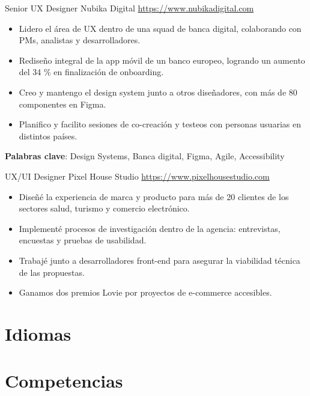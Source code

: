 \documentclass[a4paper, serif, 10pt]{moderncv}
\begin{document}
        {Senior UX Designer}
        {Nubika Digital}
        {\url{https://www.nubikadigital.com}}
        {}
        {\begin{itemize}
\item Lidero el área de UX dentro de una squad de banca digital, colaborando con PMs, analistas y desarrolladores.
\item Rediseño integral de la app móvil de un banco europeo, logrando un aumento del 34 \% en finalización de onboarding.
\item Creo y mantengo el design system junto a otros diseñadores, con más de 80 componentes en Figma.
\item Planifico y facilito sesiones de co-creación y testeos con personas usuarias en distintos países.
\end{itemize}
\textbf{Palabras clave}: Design Systems, Banca digital, Figma, Agile, Accessibility}

        {UX/UI Designer}
        {Pixel House Studio}
        {\url{https://www.pixelhousestudio.com}}
        {}
        {\begin{itemize}
\item Diseñé la experiencia de marca y producto para más de 20 clientes de los sectores salud, turismo y comercio electrónico.
\item Implementé procesos de investigación dentro de la agencia: entrevistas, encuestas y pruebas de usabilidad.
\item Trabajé junto a desarrolladores front-end para asegurar la viabilidad técnica de las propuestas.
\item Ganamos dos premios Lovie por proyectos de e-commerce accesibles.
\end{itemize}}
\section{Idiomas}

\section{Competencias}

\end{document}
